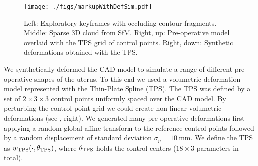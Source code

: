 \begin{figure}[htb]
  \centering
  \texttt{[image: ./figs/markupWithDefSim.pdf]}
\caption{Left: Exploratory keyframes with occluding contour fragments. Middle: Sparse 3D cloud from SfM. Right, up: Pre-operative model overlaid with the TPS grid of control points. Right, down: Synthetic deformations obtained with the TPS.}
\label{fig:reconstruction}
\end{figure}

We synthetically deformed the CAD model to simulate a range of different pre-operative shapes of the uterus. To this end we used a volumetric deformation model represented with the Thin-Plate Spline (TPS). The TPS was defined by a set of $2\times 3 \times 3$ control points uniformly spaced over the CAD model. By perturbing the control point grid we could create non-linear volumetric deformations (see , right). We generated many pre-operative deformations first applying a random global affine transform to the reference control points followed by a random displacement of standard deviation $\sigma_p=\SI{10}{\milli\metre}$. We define the TPS as $w_{\text{TPS}}(\cdot,\theta_{\text{TPS}})$, where $\theta_{\text{TPS}}$ holds the control centers (\ie $18\times 3$ parameters in total).

